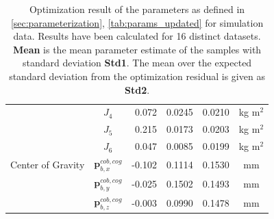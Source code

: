\begin{table}[H]
\begin{tabular}{lcrrrc}
               & $J_4$ &  0.072 & 0.0245 & 0.0210 & kg m$^2$ \\
               & $J_5$ &  0.215 & 0.0173 & 0.0203 & kg m$^2$ \\
               & $J_6$ &  0.047 & 0.0085 & 0.0199 & kg m$^2$ \\
\hline
Center of Gravity & $\mathbf{p}_{b,x}^{cob,cog}$ & -0.102 & 0.1114 & 0.1530 & mm \\
                  & $\mathbf{p}_{b,y}^{cob,cog}$ & -0.025 & 0.1502 & 0.1493 & mm \\
                  & $\mathbf{p}_{b,z}^{cob,cog}$ & -0.003 & 0.0990 & 0.1478 & mm \\
\hline
\end{tabular}
\caption{Optimization result of the parameters as defined in \cref{sec:parameterization}, \cref{tab:params_updated} for simulation data. Results have been calculated for 16 distinct datasets. \textbf{Mean} is the mean parameter estimate of the samples with standard deviation \textbf{Std1}. The mean over the expected standard deviation from the optimization residual is given as \textbf{Std2}.}
\end{table}

